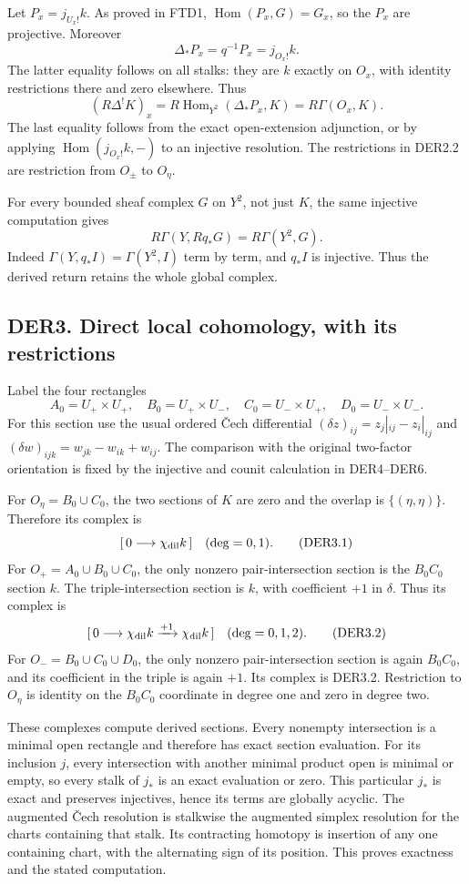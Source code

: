 Let \(P_x=j_{U_x!}k\). As proved in FTD1,
\(\operatorname{Hom}(P_x,G)=G_x\), so the \(P_x\) are projective.
Moreover \[
\Delta_*P_x=q^{-1}P_x=j_{O_x!}k.
\] The latter equality follows on all stalks: they are \(k\) exactly on
\(O_x\), with identity restrictions there and zero elsewhere. Thus \[
(R\Delta^!K)_x
=R\operatorname{Hom}_{Y^2}(\Delta_*P_x,K)
=R\Gamma(O_x,K).
\tag{DER2.2}
\] The last equality follows from the exact open-extension adjunction,
or by applying \(\operatorname{Hom}(j_{O_x!}k,-)\) to an injective
resolution. The restrictions in DER2.2 are restriction from \(O_\pm\) to
\(O_\eta\).

For every bounded sheaf complex \(G\) on \(Y^2\), not just \(K\), the
same injective computation gives \[
\boxed{R\Gamma(Y,Rq_*G)=R\Gamma(Y^2,G).}
\tag{DER2.3}
\] Indeed \(\Gamma(Y,q_*I)=\Gamma(Y^2,I)\) term by term, and \(q_*I\) is
injective. Thus the derived return retains the whole global complex.

\subsection{DER3. Direct local cohomology, with its
restrictions}\label{der3.-direct-local-cohomology-with-its-restrictions}

Label the four rectangles \[
A_0=U_+\times U_+,\quad B_0=U_+\times U_-,
\quad C_0=U_-\times U_+,\quad D_0=U_-\times U_-.
\] For this section use the usual ordered Čech differential
\((\delta z)_{ij}=z_j|_{ij}-z_i|_{ij}\) and
\((\delta w)_{ijk}=w_{jk}-w_{ik}+w_{ij}\). The comparison with the
original two-factor orientation is fixed by the injective and counit
calculation in DER4--DER6.

For \(O_\eta=B_0\cup C_0\), the two sections of \(K\) are zero and the
overlap is \(\{(\eta,\eta)\}\). Therefore its complex is \[
[\,0\longrightarrow\chi_{\rm dil}k\,]\quad(\deg=0,1).
\tag{DER3.1}
\] For \(O_+=A_0\cup B_0\cup C_0\), the only nonzero pair-intersection
section is the \(B_0C_0\) section \(k\). The triple-intersection section
is \(k\), with coefficient \(+1\) in \(\delta\). Thus its complex is \[
[\,0\longrightarrow\chi_{\rm dil}k
 \xrightarrow{+1}\chi_{\rm dil}k\,]\quad(\deg=0,1,2).
\tag{DER3.2}
\] For \(O_-=B_0\cup C_0\cup D_0\), the only nonzero pair-intersection
section is again \(B_0C_0\), and its coefficient in the triple is again
\(+1\). Its complex is DER3.2. Restriction to \(O_\eta\) is identity on
the \(B_0C_0\) coordinate in degree one and zero in degree two.

These complexes compute derived sections. Every nonempty intersection is
a minimal open rectangle and therefore has exact section evaluation. For
its inclusion \(j\), every intersection with another minimal product
open is minimal or empty, so every stalk of \(j_*\) is an exact
evaluation or zero. This particular \(j_*\) is exact and preserves
injectives, hence its terms are globally acyclic. The augmented Čech
resolution is stalkwise the augmented simplex resolution for the charts
containing that stalk. Its contracting homotopy is insertion of any one
containing chart, with the alternating sign of its position. This proves
exactness and the stated computation.

